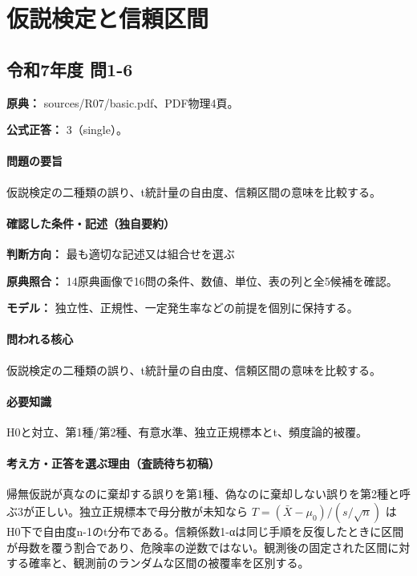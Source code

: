 \section{仮説検定と信頼区間}

\subsection{令和7年度 問1-6}
\label{q:r07-reg-basic-1-6}

\noindent\textbf{原典：} sources/R07/basic.pdf、PDF物理4頁。

\textbf{公式正答：} 3（single）。

\paragraph{問題の要旨} 仮説検定の二種類の誤り、t統計量の自由度、信頼区間の意味を比較する。

\paragraph{確認した条件・記述（独自要約）}\mbox{}\par

\noindent\textbf{判断方向：} 最も適切な記述又は組合せを選ぶ\par

\noindent\textbf{原典照合：} 14原典画像で16問の条件、数値、単位、表の列と全5候補を確認。\par

\noindent\textbf{モデル：} 独立性、正規性、一定発生率などの前提を個別に保持する。\par

\paragraph{問われる核心} 仮説検定の二種類の誤り、t統計量の自由度、信頼区間の意味を比較する。

\paragraph{必要知識} H0と対立、第1種/第2種、有意水準、独立正規標本とt、頻度論的被覆。

\paragraph{考え方・正答を選ぶ理由（査読待ち初稿）} 帰無仮説が真なのに棄却する誤りを第1種、偽なのに棄却しない誤りを第2種と呼ぶ3が正しい。独立正規標本で母分散が未知なら \(T=(\bar X-\mu_0)/(s/\sqrt n)\) はH0下で自由度n-1のt分布である。信頼係数1-αは同じ手順を反復したときに区間が母数を覆う割合であり、危険率の逆数ではない。観測後の固定された区間に対する確率と、観測前のランダムな区間の被覆率を区別する。

